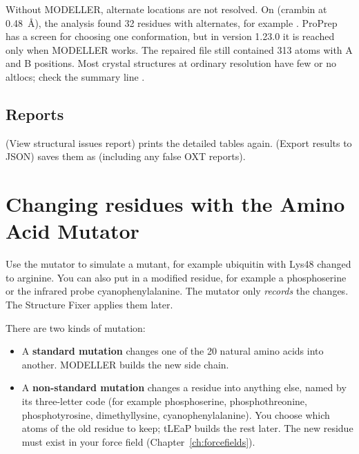 \begin{watchout}
Without MODELLER, alternate locations are not resolved. On 
(crambin at 0.48~Å), the analysis found 32 residues with alternates, for
example . ProPrep has a
screen for choosing one conformation, but in version 1.23.0 it is reached only
when MODELLER works. The repaired file still contained 313 atoms with A and B
positions. Most crystal structures at ordinary resolution have few or no
altlocs; check the summary line .
\end{watchout}

\subsection{Reports}

 (View structural issues report) prints the detailed tables again.
 (Export results to JSON) saves them as 
(including any false OXT reports).

\section{Changing residues with the Amino Acid Mutator}
\label{sec:cleaning-mutator}

Use the mutator to simulate a mutant, for example ubiquitin with Lys48 changed
to arginine. You can also put in a modified residue, for example a
phosphoserine or the infrared probe cyanophenylalanine. The mutator only
\emph{records} the changes. The Structure Fixer applies them later.

There are two kinds of mutation:
\begin{itemize}
  \item A \textbf{standard mutation} changes one of the 20 natural amino acids
        into another. MODELLER builds the new side chain.
  \item A \textbf{non-standard mutation} changes a residue into anything else,
        named by its three-letter code (for example 
        phosphoserine,  phosphothreonine, 
        phosphotyrosine,  dimethyllysine, 
        cyanophenylalanine). You choose which atoms of the old residue to keep;
        tLEaP builds the rest later. The new residue must exist in your force
        field (Chapter~\ref{ch:forcefields}).
\end{itemize}

